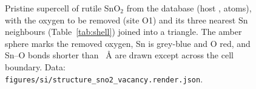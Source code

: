 \begin{figure}[htbp]
\centering
{}
\caption{Pristine supercell of rutile SnO$_2$ from the database (host \mpsnotwo{}, \numRenderSnOTwoNAtoms{} atoms), with the
oxygen to be removed (site O1) and its three nearest Sn neighbours (Table~\ref{tab:shell}) joined into a triangle.
The amber sphere marks the removed oxygen, Sn is grey-blue and O red, and Sn--O bonds shorter than
\numRenderSnOTwoCationOBondCutoffASn{}~\AA{} are drawn except across the cell boundary. Data:
\texttt{figures/si/structure\_sno2\_vacancy.render.json}.}
\label{fig:sno2}
\end{figure}
\FloatBarrier
